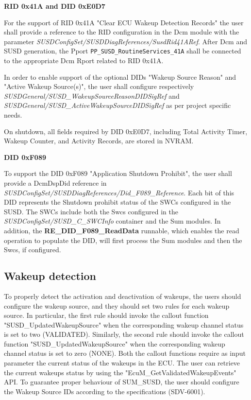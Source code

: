 {\textbf{ RID 0x41A and DID 0xE0D7}

For the support of RID 0x41A "Clear ECU Wakeup Detection Records" the user shall provide a reference to the RID configuration in the Dcm module with the parameter \textit{SUSDConfigSet/SUSDDiagReferences/SusdRid41ARef}.
After Dcm and SUSD generation, the Pport \texttt{PP\_SUSD\_RoutineServices\_41A} shall be connected to the appropriate Dcm Rport related to RID 0x41A.

In order to enable support of the optional DIDs "Wakeup Source Reason" and \\"Active Wakeup Source(s)", the user shall configure respectively\\ \textit{SUSDGeneral/SUSD\_WakeupSourceReasonDIDSigRef} and\\ \textit{SUSDGeneral/SUSD\_ActiveWakeupSourceDIDSigRef} as per project specific needs.

On shutdown, all fields required by DID 0xE0D7, including Total Activity Timer, Wakeup Counter, and Activity Records, are stored in NVRAM.

\textbf{ DID 0xF089}

To support the DID 0xF089 "Application Shutdown Prohibit", the user shall provide a DcmDspDid reference in \textit{SUSDConfigSet/SUSDDiagReferences/Did\_F089\_Reference}.
Each bit of this DID represents the Shutdown prohibit status of the SWCs configured in the SUSD. The SWCs include both the Swcs configured in the \textit{SUSDConfigSet/SUSD\_C\_SWCInfo} container and the Sum modules.
In addition, the \textbf{RE\_DID\_F089\_ReadData} runnable, which enables the read operation to populate the DID, will first process the Sum modules and then the Swcs, if configured.

\subsection{Wakeup detection}
To properly detect the activation and deactivation of wakeups, the users should configure the wakeup source, and they should set two rules for each wakeup source. 
In particular, the first rule should invoke the callout function "SUSD\_UpdatedWakeupSource" when the corresponding wakeup channel status is set to two (VALIDATED). 
Similarly, the second rule should invoke the callout function "SUSD\_UpdatedWakeupSource" when the corresponding wakeup channel status is set to zero (NONE). 
Both the callout functions require as input parameter the current status of the wakeups in the ECU. 
The user can retrieve the current wakeups status by using the "EcuM\_GetValidatedWakeupEvents" API. 
To guarantee proper behaviour of SUM\_SUSD, the user should configure the Wakeup Source IDs according to the specifications (SDV-6001).


}
